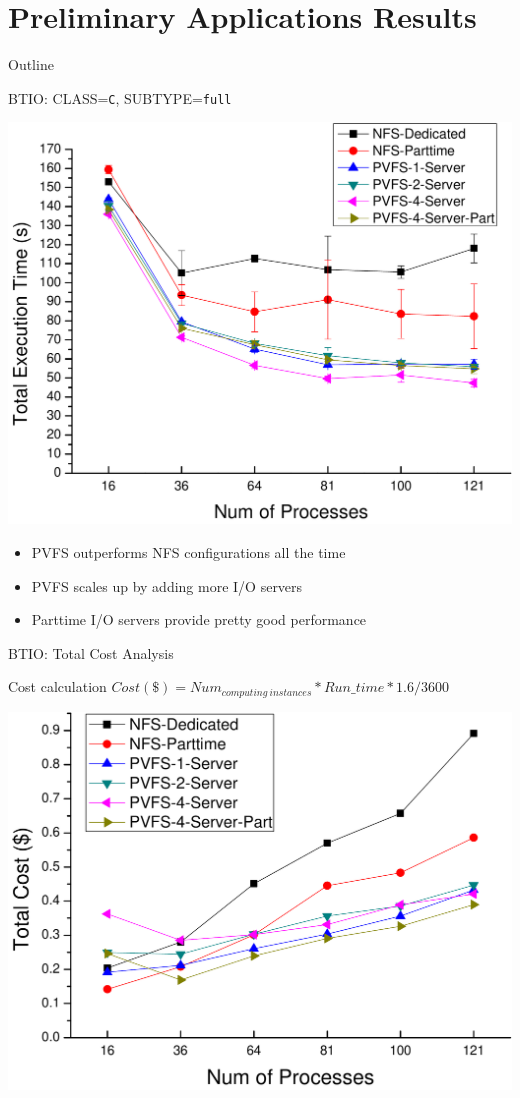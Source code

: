 \documentclass{beamer}
\begin{document}
\section{Preliminary Applications Results}
\begin{frame}{Outline}
    \tableofcontents[current]
\end{frame}

\begin{frame}{BTIO: CLASS=\texttt{C}, SUBTYPE=\texttt{full}}
    \begin{center}
        \includegraphics[width=.55\textwidth]{figures/T-time}
    \end{center}
    \pause
    \begin{itemize}
        \item PVFS outperforms NFS configurations all the time
        \pause
        \item PVFS scales up by adding more I/O servers
        \pause
        \item Parttime I/O servers provide pretty good performance
    \end{itemize}
\end{frame}

\begin{frame}{BTIO: Total Cost Analysis}
    \begin{exampleblock}{Cost calculation}
        $Cost (\$) = Num_{computing~instances} * Run\_time * 1.6 / 3600 $
    \end{exampleblock}
    \begin{center}
        \includegraphics[width=.6\textwidth]{figures/T-cost}
    \end{center}
\end{frame}
\end{document}
